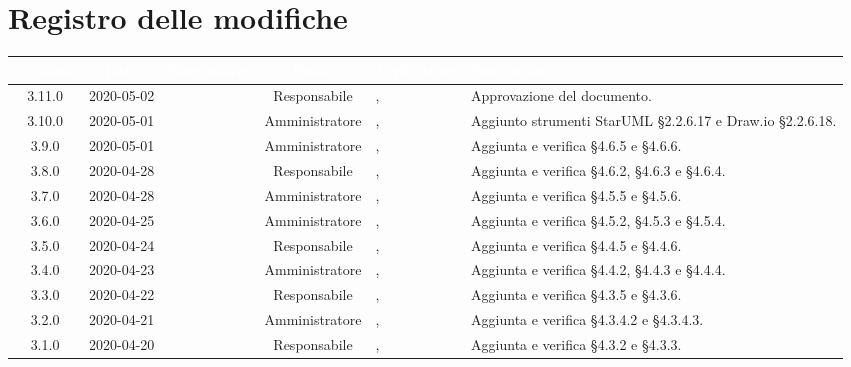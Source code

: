 \section*{Registro delle modifiche}
{
\renewcommand{\arraystretch}{1.5}
\centering
\begin{longtable}{ c c  C{2.3cm} c C{3cm} C{3.2cm}}
\textcolor{white}{\textbf{Versione}}&
\textcolor{white}{\textbf{Data}}&
\textcolor{white}{\textbf{Nominativo}}&
\textcolor{white}{\textbf{Ruolo}}&
\textcolor{white}{\textbf{Verificatore}}&
\textcolor{white}{\textbf{Descrizione}}\\	
\endhead

3.11.0 & 2020-05-02 & \DF{} & Responsabile & \AT{}, \PF{} &  Approvazione del documento. \\

3.10.0 & 2020-05-01 & \MC{} & Amministratore &  \AT{}, \PF{} & Aggiunto strumenti StarUML §2.2.6.17 e Draw.io §2.2.6.18. \\

3.9.0 & 2020-05-01 & \BR{} & Amministratore &  \AT{}, \PF{} & Aggiunta e verifica §4.6.5 e §4.6.6.  \\

3.8.0 & 2020-04-28 & \LD{} & Responsabile &  \AT{}, \PF{} & Aggiunta e verifica §4.6.2, §4.6.3 e §4.6.4.  \\

3.7.0 & 2020-04-28 & \SE{} & Amministratore &  \AT{}, \PF{} & Aggiunta e verifica §4.5.5 e §4.5.6.  \\

3.6.0 & 2020-04-25 & \BR{} & Amministratore &  \AT{}, \PF{} & Aggiunta e verifica §4.5.2, §4.5.3 e §4.5.4.  \\

3.5.0 & 2020-04-24 & \LD{} & Responsabile &  \AT{}, \PF{} & Aggiunta e verifica §4.4.5 e §4.4.6.  \\

3.4.0 & 2020-04-23 & \BR{} & Amministratore &  \AT{}, \PF{} & Aggiunta e verifica §4.4.2, §4.4.3 e §4.4.4.  \\

3.3.0 & 2020-04-22 & \LD{} & Responsabile &  \AT{}, \PF{} & Aggiunta e verifica §4.3.5 e §4.3.6.  \\

3.2.0 & 2020-04-21 & \SE{} & Amministratore &  \AT{}, \PF{} & Aggiunta e verifica §4.3.4.2 e §4.3.4.3.  \\

3.1.0 & 2020-04-20 & \LD{} & Responsabile &  \AT{}, \PF{} & Aggiunta e verifica §4.3.2 e §4.3.3.  \\


\end{longtable}}
